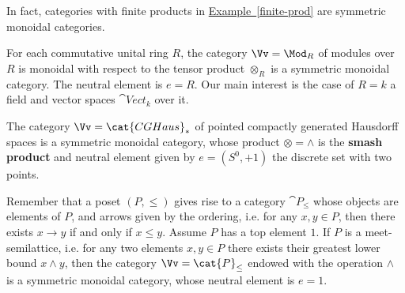 \begin{ex}
    In fact, categories with finite products in \hyperref[finite-prod]{Example~\ref*{finite-prod}}
    are symmetric monoidal categories.
\end{ex}

\begin{ex}
    For each commutative unital ring $R$, the category $\Vv=\Mod_{R}$
    of modules over $R$ is monoidal with respect to the tensor product $\otimes_{R}$
    is a symmetric monoidal category. The neutral element is $e = R$.
    Our main interest is the case of $R=k$ a field 
    and vector spaces $\cat{Vect}_{k}$ over it.
\end{ex}

\begin{ex}
    The category $\Vv=\cat{CGHaus}_{\ast}$ of pointed compactly generated
    Hausdorff spaces is a symmetric monoidal category, 
    whose product $\otimes = \wedge$ is the \textbf{smash product}
    and neutral element given by $e = (S^{0}, +1)$ the discrete set with two points.
\end{ex}

\begin{ex}
    Remember that a poset $(P, \le)$ gives rise to a category $\cat{P}_{\le}$
    whose objects are elements of $P$, and arrows given by the ordering, i.e.
    for any $x,y \in P$, then there exists $x \to y$ if and only if $x \le y$.
    Assume $P$ has a top element $1$. If $P$ is a meet-semilattice,
    i.e. for any two elements $x,y \in P$ there exists their greatest lower bound
    $x \wedge y$, then the category $\Vv=\cat{P}_{\le}$ endowed with the operation
    $\wedge$ is a symmetric monoidal category, whose neutral element is $e=1$.
\end{ex}

